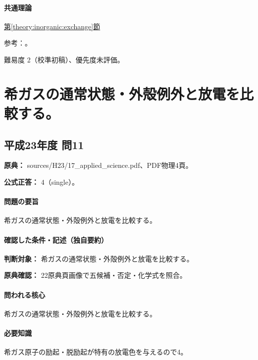 \paragraph{共通理論} \hyperref[theory:inorganic:exchange]{第\ref*{theory:inorganic:exchange}節}

\par 参考：\cite{inorganic_zeolite}。

\par 難易度 2（校準初稿）、優先度未評価。

\section{希ガスの通常状態・外殻例外と放電を比較する。}

\subsection{平成23年度 問11}
\label{q:h23-reg-applied-11}

\noindent\textbf{原典：} sources/H23/17\_applied\_science.pdf、PDF物理4頁。

\textbf{公式正答：} 4（single）。

\paragraph{問題の要旨} 希ガスの通常状態・外殻例外と放電を比較する。

\paragraph{確認した条件・記述（独自要約）}\mbox{}\par

\noindent\textbf{判断対象：} 希ガスの通常状態・外殻例外と放電を比較する。\par

\noindent\textbf{原典確認：} 22原典頁画像で五候補・否定・化学式を照合。\par

\paragraph{問われる核心} 希ガスの通常状態・外殻例外と放電を比較する。

\paragraph{必要知識} 希ガス原子の励起・脱励起が特有の放電色を与えるので4。

